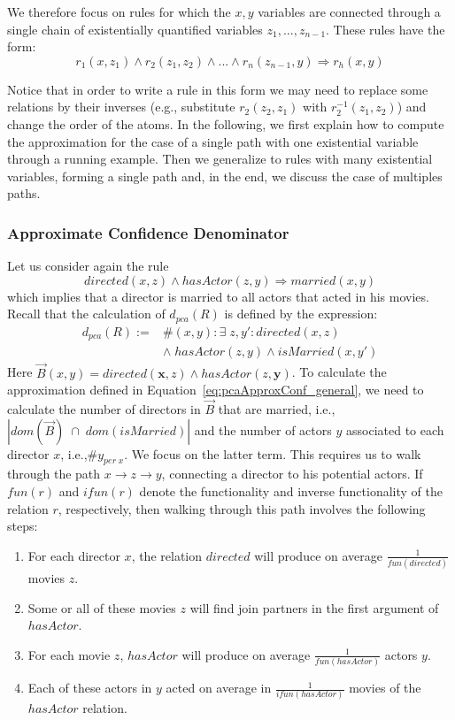 {We therefore focus on rules for which the $x,y$ variables are connected through a single 
chain of existentially quantified 
variables $z_1,..., z_{n-1}$. These rules have the form:
$$
  r_1(x,z_1) \wedge r_2(z_1,z_2) \wedge ... \wedge r_n(z_{n-1},y) \Rightarrow r_h(x,y)
$$

Notice that in order to write a rule in this form we may need to replace some relations by their inverses
(e.g., substitute $r_2(z_2,z_1)$ with $r_2^{-1}(z_1,z_2)$)
and change the order of the atoms.
In the following, we first explain how to compute the approximation for the case of a single 
path with one existential variable through a running example.
Then we generalize to rules with many existential variables, forming a single path and, 
in the end, we discuss the case of multiples paths.


\subsubsection{Approximate Confidence Denominator}
Let us consider again the rule
\[
 directed(x,z) \wedge hasActor(z,y) \Rightarrow married(x,y)
\]
which implies that a director is married to all actors that acted in his movies.
Recall that the calculation of $d_{pca}(R)$ is defined by the expression:
\[
\begin{array}{rl}
d_{pca}(R) := &\#(x,y): \exists\; z, y': directed(x,z)  \\
  &\wedge\; hasActor(z,y) \wedge isMarried(x,y') \label{eq:denomPCAExample}
\end{array}
\]
Here $\vec{B}(x, y) = directed(\bm{x},z) \wedge hasActor(z,\bm{y})$.
To calculate the approximation defined in Equation~\ref{eq:pcaApproxConf_general}, 
we need to calculate the number of directors in $\vec{B}$ that are married, i.e.,  
$|dom(\vec{B})\;\cap\;dom(isMarried)|$ and the number of actors $y$ 
associated to each director $x$, i.e.,$\#y_{per\;x}$.
We focus on the latter term. This requires us to walk through the path $x \rightarrow z \rightarrow y$, connecting a director to his potential actors. If $fun(r)$ and $ifun(r)$
denote the functionality and inverse functionality of the relation $r$, respectively, then
walking through this path involves the following steps:
\begin{enumerate} \itemsep +0.3ex
 \item For each director $x$, the relation $directed$ will produce on average $\frac{1}{fun(directed)}$ movies $z$.
 \item Some or all of these movies $z$ will find join partners in the first argument of $hasActor$.
 \item For each movie $z$, $hasActor$ will produce on average $\frac{1}{fun(hasActor)}$ actors $y$.
 \item Each of these actors in $y$ acted on average in  $\frac{1}{ifun(hasActor)}$ movies of the $hasActor$ relation.
\end{enumerate}

}
